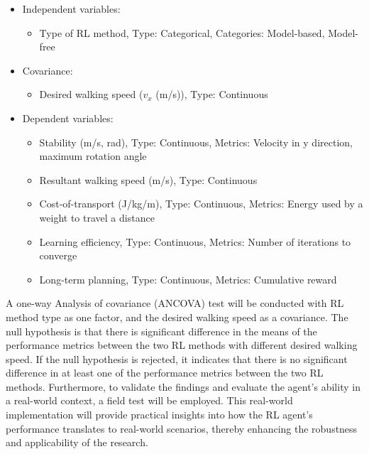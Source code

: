 \begin{itemize}
    \item Independent variables: 
    \begin{itemize}
        \item Type of RL method, Type: Categorical, Categories: Model-based, Model-free
    \end{itemize}
    \item Covariance:
    \begin{itemize}
        \item Desired walking speed ($v_x$ (m/s)), Type: Continuous
    \end{itemize}
    \item Dependent variables:
    \begin{itemize}
        \item Stability (m/s, rad), Type: Continuous, Metrics: Velocity in y direction, maximum rotation angle 
        \item Resultant walking speed (m/s), Type: Continuous
        \item Cost-of-transport (J/kg/m), Type: Continuous, Metrics: Energy used by a weight to travel a distance
        \item Learning efficiency, Type: Continuous, Metrics: Number of iterations to converge
        \item Long-term planning, Type: Continuous, Metrics: Cumulative reward
    \end{itemize}
\end{itemize}
A one-way Analysis of covariance (ANCOVA) test will be conducted with \ac{RL} method type as one factor, and the desired walking speed as a covariance. The null hypothesis is that there is significant difference in the means of the performance metrics between the two RL methods with different desired walking speed. If the null hypothesis is rejected, it indicates that there is no significant difference in at least one of the performance metrics between the two RL methods. Furthermore, to validate the findings and evaluate the agent's ability in a real-world context, a field test will be employed. This real-world implementation will provide practical insights into how the RL agent's performance translates to real-world scenarios, thereby enhancing the robustness and applicability of the research. 

